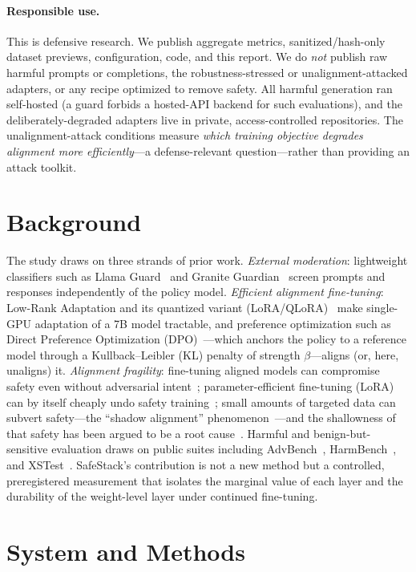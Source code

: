 \documentclass[11pt,a4paper]{article}
\begin{document}
\paragraph{Responsible use.}
This is defensive research. We publish aggregate metrics, sanitized/hash-only dataset
previews, configuration, code, and this report. We do \emph{not} publish raw harmful prompts
or completions, the robustness-stressed or unalignment-attacked adapters, or any recipe
optimized to remove safety. All harmful generation ran self-hosted (a guard forbids a
hosted-API backend for such evaluations), and the deliberately-degraded adapters live in
private, access-controlled repositories. The unalignment-attack conditions measure
\emph{which training objective degrades alignment more efficiently}---a defense-relevant
question---rather than providing an attack toolkit.

\section{Background}

The study draws on three strands of prior work. \emph{External moderation}:
lightweight classifiers such as Llama Guard~\cite{llamaguard} and Granite Guardian~\cite{granite} screen
prompts and responses independently of the policy model. \emph{Efficient alignment
fine-tuning}: Low-Rank Adaptation and its quantized variant (LoRA/QLoRA)~\cite{lora,qlora} make single-GPU adaptation of a 7B model
tractable, and preference optimization such as Direct Preference Optimization (DPO)~\cite{dpo}---which anchors the
policy to a reference model through a Kullback--Leibler (KL) penalty of strength $\beta$---aligns
(or, here, unaligns) it. \emph{Alignment fragility}: fine-tuning aligned models can
compromise safety even without adversarial intent~\cite{ftcompromises}; parameter-efficient
fine-tuning (LoRA) can by itself cheaply undo safety training~\cite{lermen}; small amounts of
targeted data can subvert safety---the ``shadow alignment'' phenomenon~\cite{shadow}---and the
shallowness of that safety has been argued to be a root cause~\cite{shallowsafety}. Harmful
and benign-but-sensitive evaluation draws on public suites including
AdvBench~\cite{advbench}, HarmBench~\cite{harmbench}, and XSTest~\cite{xstest}. SafeStack's
contribution is not a new method but a controlled, preregistered measurement that isolates the
marginal value of each layer and the durability of the weight-level layer under continued
fine-tuning.

\section{System and Methods}
\end{document}

